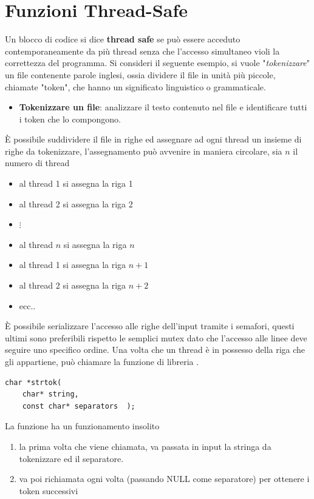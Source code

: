 \documentclass[10pt, letterpaper]{report}
\begin{document}
\section{Funzioni Thread-Safe}
 Un blocco di codice si dice \textbf{thread safe} se può essere acceduto contemporaneamente da più thread senza che l'accesso simultaneo violi la correttezza del programma.\acc 
Si consideri il seguente esempio, si vuole "\textit{tokenizzare}"  un file contenente parole inglesi, ossia  dividere il file in unità più piccole, chiamate "token", che hanno un significato linguistico o grammaticale.\begin{itemize}
    \item \textbf{Tokenizzare un file}: analizzare il testo contenuto nel file e identificare tutti i token che lo compongono.
\end{itemize}
È possibile suddividere il file in righe ed assegnare ad ogni thread un insieme di righe da tokenizzare, l'assegnamento può avvenire in maniera circolare, sia $n$ il numero di thread\begin{itemize}
    \item al thread 1 si assegna la riga 1 
    \item al thread 2 si assegna la riga 2 
    \item  $\vdots$  
    \item al thread $n$ si assegna la riga $n$  
    \item al thread 1 si assegna la riga $n+1$
    \item al thread 2 si assegna la riga $n+2$ 
    \item ecc..
\end{itemize}
È possibile serializzare l'accesso alle righe dell'input tramite i semafori, questi ultimi sono preferibili rispetto le semplici mutex dato che l'accesso alle linee deve seguire uno specifico ordine. Una volta che un thread è in possesso della riga che gli appartiene, può chiamare la funzione di libreria . 
\begin{lstlisting}[style=CStyle]
char *strtok(
    char* string,
    const char* separators  );
\end{lstlisting}
La funzione  ha un funzionamento insolito\begin{enumerate}
    \item la prima volta che viene chiamata, va passata in input la stringa da tokenizzare ed il separatore. 
    \item va poi richiamata ogni volta (passando NULL come separatore) per ottenere i token successivi
\end{enumerate}
\end{document}
